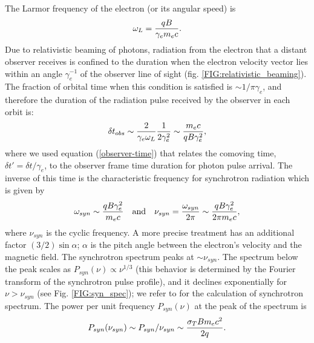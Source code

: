 \documentclass[12pt,a4paper]{article}
\begin{document}
The Larmor frequency of the electron (or its angular speed) is
\begin{equation}
   \omega_L = {q B \over \gamma_e m_e c}.
\end{equation}
Due to relativistic beaming of photons, radiation from the electron that a distant observer receives is confined to the duration when the electron velocity vector lies within an angle $\gamma_e^{-1}$ of the observer line of sight (fig. \ref{FIG:relativistic_beaming}).
The fraction of orbital time when this condition is satisfied is
$\sim 1/\pi\gamma_e$, and therefore the duration of the radiation
pulse received by the observer in each orbit is:
\begin{equation}
   \delta t_{obs} \sim {2\over \gamma_e\omega_L} {1\over 2\gamma_e^2}
        \sim {m_e c \over q B \gamma_e^2},
\end{equation}
where we used equation (\ref{observer-time}) that relates the
comoving time, $\delta t' = \delta t/\gamma_e$, to the observer
frame time duration for photon pulse arrival. The inverse of this
time is the characteristic frequency for synchrotron radiation 
which is given by
\begin{equation}
    \omega_{syn} \sim {q B \gamma_e^2\over m_e c} \quad{\rm and}\quad
     \nu_{syn} = {\omega_{syn} \over 2\pi} \sim {q B \gamma_e^2\over 2\pi 
   m_e c}, 
  \label{syn_omega}
\end{equation}
where $\nu_{syn}$ is the cyclic frequency. A more precise treatment
has an additional factor $(3/2)\sin \alpha$; $\alpha$ is the pitch angle 
between the electron's velocity and the magnetic field.
The synchrotron spectrum peaks at $\sim\nu_{syn}$. The spectrum 
below the peak scales as $P_{syn}(\nu) \propto \nu^{1/3}$ (this behavior is 
determined by the Fourier transform of the synchrotron pulse profile),
and it declines exponentially for $\nu>\nu_{syn}$ (see Fig. 
\ref{FIG:syn_spec}); we
refer to \cite{rybicki79} for the calculation of synchrotron
spectrum. The power per unit frequency $P_{syn}(\nu)$ 
at the peak of the spectrum is
\begin{equation}
   P_{syn}(\nu_{syn}) \sim P_{syn}/\nu_{syn} \sim {\sigma_T B m_e c^2
     \over 2 q}.
    \label{p_syn_peak}
\end{equation}
\end{document}
